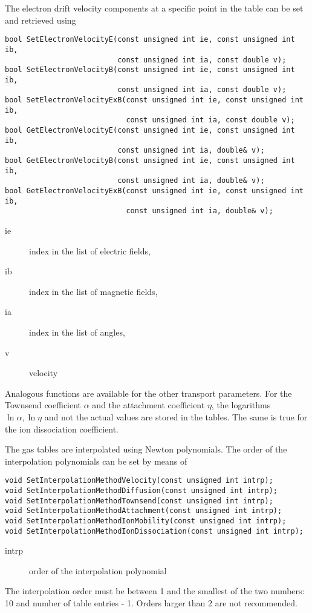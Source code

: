 The electron drift velocity components at a specific point in the table 
can be set and retrieved using
\begin{lstlisting}
bool SetElectronVelocityE(const unsigned int ie, const unsigned int ib,
                          const unsigned int ia, const double v);
bool SetElectronVelocityB(const unsigned int ie, const unsigned int ib,
                          const unsigned int ia, const double v);
bool SetElectronVelocityExB(const unsigned int ie, const unsigned int ib,
                            const unsigned int ia, const double v);
bool GetElectronVelocityE(const unsigned int ie, const unsigned int ib,
                          const unsigned int ia, double& v);
bool GetElectronVelocityB(const unsigned int ie, const unsigned int ib,
                          const unsigned int ia, double& v);
bool GetElectronVelocityExB(const unsigned int ie, const unsigned int ib,
                            const unsigned int ia, double& v);
\end{lstlisting}
\begin{description}
  \item[ie] index in the list of electric fields,
  \item[ib] index in the list of magnetic fields,
  \item[ia] index in the list of angles,
  \item[v] velocity
\end{description}
Analogous functions are available for the other transport parameters.
For the Townsend coefficient $\alpha$ and the attachment coefficient
$\eta$, the logarithms $\ln\alpha, \ln\eta$ and not the actual values 
are stored in the tables. 
The same is true for the ion dissociation coefficient. 
 
The gas tables are interpolated using Newton polynomials. 
The order of the interpolation polynomials can be set by means of
\begin{lstlisting}
void SetInterpolationMethodVelocity(const unsigned int intrp);
void SetInterpolationMethodDiffusion(const unsigned int intrp);
void SetInterpolationMethodTownsend(const unsigned int intrp);
void SetInterpolationMethodAttachment(const unsigned int intrp);
void SetInterpolationMethodIonMobility(const unsigned int intrp);
void SetInterpolationMethodIonDissociation(const unsigned int intrp);
\end{lstlisting}
\begin{description}
\item[intrp]
order of the interpolation polynomial 
\end{description}
The interpolation order must be between 1 and the smallest of the two 
numbers: 10 and number of table entries - 1. 
Orders larger than 2 are not recommended.

